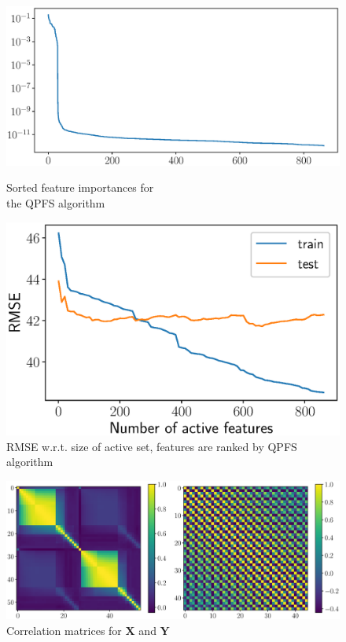 \documentclass[12pt,twoside]{article}
\newcommand{\bY}{\mathbf{Y}}
\newcommand{\bX}{\mathbf{X}}
\begin{document}
\begin{figure}
	\begin{minipage}{.5\linewidth}
		\centering
		\includegraphics[width=\linewidth]{figs/feature_scores_ex.eps}
		\caption{Sorted feature importances for \\ the QPFS algorithm}
		\label{fig:feature_scores_ex}
	\end{minipage}%
	\begin{minipage}{.5\linewidth}
	\centering
	\includegraphics[width=\linewidth]{figs/train_test_qpfs.eps}
	\caption{RMSE w.r.t. size of active set, features are ranked by QPFS algorithm}
	\label{fig:train_test_qpfs}
	\end{minipage}
\end{figure}

\begin{figure}
	\includegraphics[width=\linewidth]{figs/corr_matrix.eps}
	\caption{Correlation matrices for $\bX$ and $\bY$}
	\label{fig:corr_matrix}
\end{figure}
\end{document}
